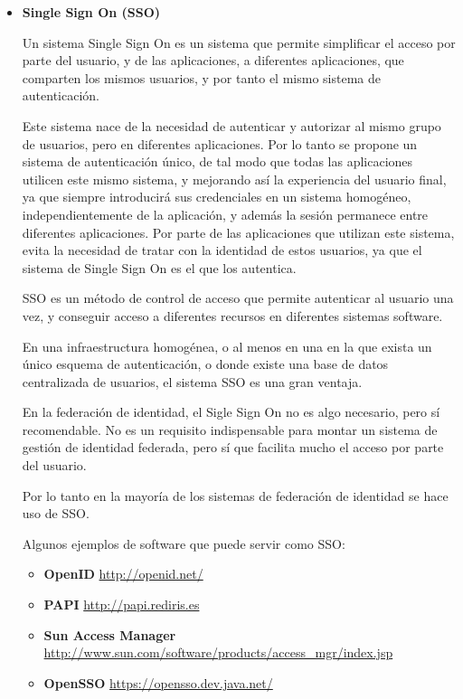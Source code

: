             \begin{itemize}

            \item \textbf{Single Sign On (SSO)}

    Un sistema Single Sign On es un sistema que permite simplificar
    el acceso por parte del usuario, y de las aplicaciones, a
    diferentes aplicaciones, que comparten los mismos usuarios, y por
    tanto el mismo sistema de autenticación.

    Este sistema nace de la necesidad de autenticar y autorizar al
    mismo grupo de usuarios, pero en diferentes aplicaciones. Por lo
    tanto se propone un sistema de autenticación único, de tal modo
    que todas las aplicaciones utilicen este mismo sistema, y
    mejorando así la experiencia del usuario final, ya que siempre
    introducirá sus credenciales en un sistema homogéneo,
    independientemente de la aplicación, y además la sesión permanece
    entre diferentes aplicaciones. Por parte de las aplicaciones que
    utilizan este sistema, evita la necesidad de tratar con la
    identidad de estos usuarios, ya que el sistema de Single Sign On
    es el que los autentica.

    SSO es un método de control de acceso que permite autenticar al
    usuario una vez, y conseguir acceso a diferentes recursos en
    diferentes sistemas software.

    En una infraestructura homogénea, o al menos en una en la que
    exista un único esquema de autenticación, o donde existe una base
    de datos centralizada de usuarios, el sistema SSO es una gran
    ventaja.

    En la federación de identidad, el Sigle Sign On no es algo
    necesario, pero sí recomendable. No es un requisito indispensable
    para montar un sistema de gestión de identidad federada, pero sí
    que facilita mucho el acceso por parte del usuario.

    Por lo tanto en la mayoría de los sistemas de federación de
    identidad se hace uso de SSO.

    Algunos ejemplos de software que puede servir como SSO:
    \begin{itemize}
        \item \textbf{OpenID} \href{http://openid.net/}{http://openid.net/}
        \item \textbf{PAPI}
        \href{http://papi.rediris.es}{http://papi.rediris.es}
        \item \textbf{Sun Access Manager}
        \href{http://www.sun.com/software/products/access_mgr/index.jsp}{http://www.sun.com/software/products/access\_mgr/index.jsp}
        \item \textbf{OpenSSO}
        \href{https://opensso.dev.java.net/}{https://opensso.dev.java.net/}
    \end{itemize}


\end{itemize}
